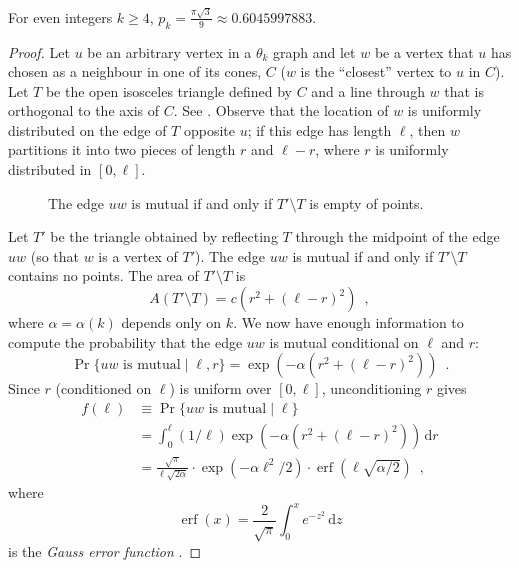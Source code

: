 \documentclass{patmorin}
\DeclareMathOperator{\erf}{erf}
\begin{document}
\begin{lem}
 For even integers $k\ge 4$, $p_k=\frac{\pi\sqrt{3}}{9}\approx 0.6045997883$.
\end{lem}

\begin{proof}
  Let $u$ be an arbitrary vertex in a $\theta_k$ graph and let $w$
  be a vertex that $u$ has chosen as a neighbour in one of its cones,
  $C$ ($w$ is the ``closest'' vertex to $u$ in $C$).  Let $T$ be the
  open isosceles triangle defined by $C$ and a line
  through $w$ that is orthogonal to the axis of $C$. See .
  Observe that the location of $w$ is uniformly distributed on the
  edge of $T$ opposite $u$;  if this edge has length $\ell$, then $w$
  partitions it into two pieces of length $r$ and $\ell-r$, where $r$
  is uniformly distributed in $[0,\ell]$.

  \begin{figure}
    \caption{The edge $uw$ is mutual if and only if $T'\setminus T$ 
       is empty of points.}
  \end{figure}
 
  Let $T'$ be the triangle obtained by reflecting $T$ through the midpoint
  of the edge $uw$ (so that $w$ is a vertex of $T'$). The edge $uw$ is
  mutual if and only if $T'\setminus T$ contains no points.  The area
  of $T'\setminus T$ is
  \[
     A(T'\setminus T) = c(r^2+(\ell-r)^2)  \enspace ,
  \]
  where $\alpha=\alpha(k)$ depends only on $k$.  We now have enough information
  to compute the probability that the edge $uw$ is mutual conditional
  on $\ell$ and $r$:
  \[
    \Pr\{\mbox{$uw$ is mutual} \mid \ell,r\} = \exp(-\alpha(r^2+(\ell-r)^2))
      \enspace .
  \]
  Since $r$ (conditioned on $\ell$) is uniform over $[0,\ell]$, unconditioning
  $r$ gives
  \begin{align*}
    f(\ell) & \equiv \Pr\{\mbox{$uw$ is mutual} \mid \ell\} \\
     & = \int_0^\ell (1/\ell)\exp(-\alpha(r^2+(\ell-r)^2))\,\mathrm{d}r \\
     & = \frac{\sqrt{\pi}}{\ell\sqrt{2\alpha}}
            \cdot\exp(-\alpha\ell^2/2)
            \cdot\erf(\ell\sqrt{\alpha/2})  \enspace ,
  \end{align*}
  where 
  \[ \erf(x)=\frac{2}{\sqrt{\pi}}\int_0^x e^{-z^2}\,\mathrm{d}z \]
  is the \emph{Gauss error function} \cite{gauss-error}.  


\end{proof}
\end{document}
